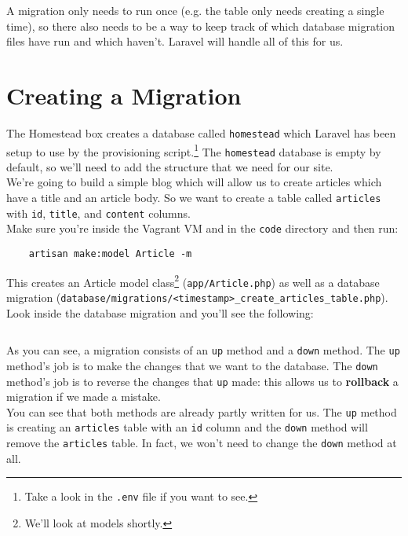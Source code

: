 A migration only needs to run once (e.g. the table only needs creating a single time), so there also needs to be a way to keep track of which database migration files have run and which haven't. Laravel will handle all of this for us.



\section{Creating a Migration}

The Homestead box creates a database called \texttt{homestead} which Laravel has been setup to use by the provisioning script.\footnote{Take a look in the \texttt{.env} file if you want to see.} The \texttt{homestead} database is empty by default, so we'll need to add the structure that we need for our site.
\\

We're going to build a simple blog which will allow us to create articles which have a title and an article body. So we want to create a table called \texttt{articles} with \texttt{id}, \texttt{title}, and \texttt{content} columns.
\\

Make sure you're inside the Vagrant VM and in the \texttt{code} directory and then run:

\begin{verbatim}
    artisan make:model Article -m
\end{verbatim}

This creates an Article model class\footnote{We'll look at models shortly.} (\texttt{app/Article.php}) as well as a database migration (\texttt{database/migrations/<timestamp>\_create\_articles\_table.php}).
\\

Look inside the database migration and you'll see the following:

\inputminted{php}{05-eloquent/figures/01-migration.php}

As you can see, a migration consists of an \texttt{up} method and a \texttt{down} method. The \texttt{up} method's job is to make the changes that we want to the database. The \texttt{down} method's job is to reverse the changes that \texttt{up} made: this allows us to \textbf{rollback} a migration if we made a mistake.
\\

You can see that both methods are already partly written for us. The \texttt{up} method is creating an \texttt{articles} table with an \texttt{id} column and the \texttt{down} method will remove the \texttt{articles} table. In fact, we won't need to change the \texttt{down} method at all.

